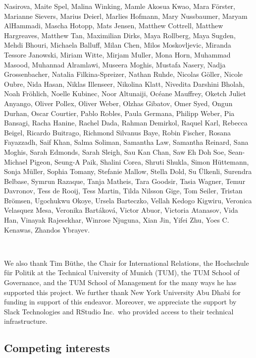 \documentclass[]{article}
\begin{document}
Nasirova, Maite Spel, Malina Winking, Mamle Akosua Kwao, Mara Förster, Marianne Sievers, Marius Deierl, Marlies Hofmann, Mary Nussbaumer, Maryam AlHammadi, Mascha Hotopp, Mats Jensen, Matthew Cottrell, Matthew Hargreaves, Matthew Tan, Maximilian Dirks, Maya Rollberg, Maya Sugden, Mehdi Bhouri, Michaela Balluff, Milan Chen, Milos Moskovljevic, Miranda Tessore Janowski, Miriam Witte, Mirjam Muller, Mona Horn, Muhammad Masood, Muhannad Alramlawi, Museera Moghis, Mustafa Nasery, Nadja Grossenbacher, Natalia Filkina-Spreizer, Nathan Ruhde, Nicolas Göller, Nicole Oubre, Nida Hasan, Niklas Illenseer, Nikolina Klatt, Nivedita Darshini Bholah, Noah Fröhlich, Noelle Kubinec, Noor Altunaiji, Océane Mauffrey, Oketch Juliet Anyango, Oliver Pollex, Oliver Weber, Olzhas Gibatov, Omer Syed, Ongun Durhan, Oscar Courtier, Pablo Robles, Paula Germana, Philipp Weber, Pia Bansagi, Racha Hanine, Rachel Dada, Rahman Demirkol, Raquel Karl, Rebecca Beigel, Ricardo Buitrago, Richmond Silvanus Baye, Robin Fischer, Rosana Fayazzadh, Saif Khan, Salma Soliman, Samantha Law, Samantha Reinard, Sana Moghis, Sarah Edmonds, Sarah Sleigh, Sau Kan Chan, Saw Eh Doh Soe, Sean-Michael Pigeon, Seung-A Paik, Shalini Corea, Shruti Shukla, Simon Hüttemann, Sonja Müller, Sophia Tomany, Stefanie Mallow, Stella Dold, Su Ülkenli, Surendra Belbase, Symrun Razaque, Tanja Matheis, Tara Goodsir, Tasia Wagner, Temur Davronov, Tess de Rooij, Tess Martin, Tilda Nilsson Gige, Tom Seiler, Tristan Brömsen, Ugochukwu Okoye, Ursela Barteczko, Vellah Kedogo Kigwiru, Veronica Velasquez Mesa, Veronika Bartáková, Victor Abuor, Victoria Atanasov, Vida Han, Vinayak Rajesekhar, Winrose Njuguna, Xian Jin, Yifei Zhu, Yoes C. Kenawas, Zhandos Ybrayev.

~
~

We also thank Tim Büthe, the Chair for International Relations, the Hochschule für Politik at the Technical University of Munich (TUM), the TUM School of Governance, and the TUM School of Management for the many ways he has supported this project. We further thank New York University Abu Dhabi for funding in support of this endeavor. Moreover, we appreciate the support by Slack Technologies and RStudio Inc.~who provided access to their technical infrastructure.

\hypertarget{competing-interests}{%
\subsection*{Competing interests}\label{competing-interests}}
\end{document}
